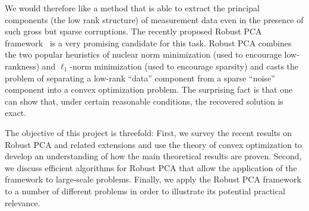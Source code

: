 We would therefore like a method that is able to extract the principal components (the low rank structure) of measurement data even in the presence of such gross but sparse corruptions. The recently proposed Robust PCA framework~\cite{Candes:2011fk} is a very promising candidate for this task. Robust PCA combines the two popular heuristics of nuclear norm minimization (used to encourage low-rankness) and $\ell_1$-norm minimization (used to encourage sparsity) and casts the problem of separating a low-rank ``data'' component from a sparse ``noise'' component into a convex optimization problem. The surprising fact is that one can show that, under certain reasonable conditions, the recovered solution is exact. 

The objective of this project is threefold: First, we survey the recent results on Robust PCA and related extensions and use the theory of convex optimization to develop an understanding of how the main theoretical results are proven. Second, we discuss efficient algorithms for Robust PCA that allow the application of the framework to large-scale problems. Finally, we apply the Robust PCA framework to a number of different problems in order to illustrate its potential practical relevance. 